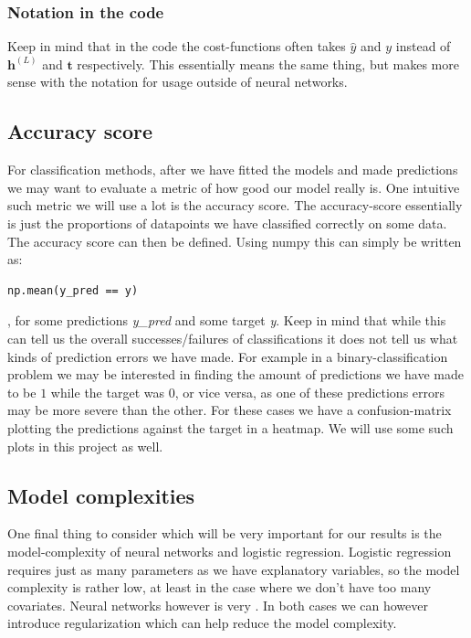 \documentclass{article}
\begin{document}
\subsubsection{Notation in the code}
Keep in mind that in the code the cost-functions often takes $\hat{y}$ and $y$
instead of $\bm{h}^{(L)}$ and $\bm{t}$ respectively. This essentially means the
same thing, but makes more sense with the notation for usage outside of neural
networks.

\subsection{Accuracy score}
For classification methods, after we have fitted the models and made predictions
we may want to evaluate a metric of how good our model really is. One intuitive
such metric we will use a lot is the accuracy score. The accuracy-score
essentially is just the proportions of datapoints we have classified correctly
on some data. The accuracy score can then be defined.
Using numpy this can simply be written as:
\begin{lstlisting}
np.mean(y_pred == y)
\end{lstlisting}
, for some predictions \textit{y\_pred} and some target \textit{y}. Keep in mind
that while this can tell us the overall successes/failures of classifications it
does not tell us what kinds of prediction errors we have made. For example in a
binary-classification problem we may be interested in finding the amount of
predictions we have made to be $1$ while the target was $0$, or vice versa, as
one of these predictions errors may be more severe than the other. For these
cases we have a confusion-matrix plotting the predictions against the target in
a heatmap. We will use some such plots in this project as well.

\subsection{Model complexities}
One final thing to consider which will be very important for our results is the
model-complexity of neural networks and logistic regression. Logistic regression
requires just as many parameters as we have explanatory variables, so the model
complexity is rather low, at least in the case where we don't have too many
covariates. Neural networks however is very . In both cases we can however
introduce regularization which can help reduce the model complexity.
\end{document}
